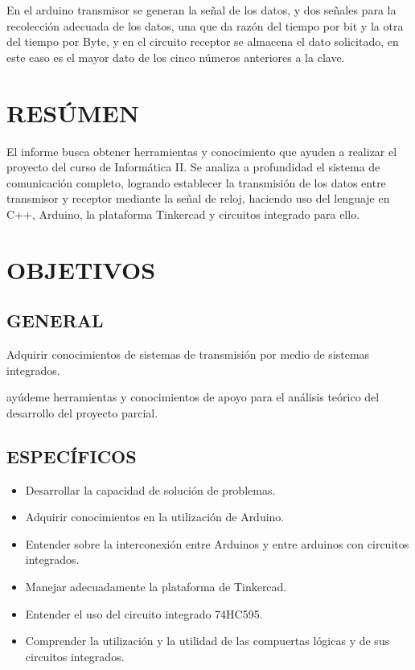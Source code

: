 \documentclass{article}
\begin{document}
En el arduino transmisor se generan la señal de los datos, y dos señales para la recolección adecuada de los datos, una que da razón del tiempo por bit y la otra del tiempo por Byte, y en el circuito receptor se almacena el dato solicitado, en este caso es el mayor dato de los cinco números anteriores a la clave.


\section{RESÚMEN}
El informe busca obtener herramientas y conocimiento que ayuden a realizar el proyecto del curso de Informática II. Se analiza a profundidad el sistema de comunicación completo, logrando  establecer la transmisión de los datos entre transmisor y receptor mediante la señal de reloj,  haciendo uso del lenguaje en C++, Arduino, la plataforma Tinkercad y circuitos integrado para ello.


\section{OBJETIVOS}

\subsection{GENERAL}

Adquirir conocimientos de sistemas de transmisión por medio de sistemas integrados.

ayúdeme herramientas y conocimientos de apoyo para el análisis teórico del desarrollo del proyecto parcial.

\subsection{ESPECÍFICOS}

\begin{itemize}

        \item Desarrollar la capacidad de solución de problemas.
        
        \item Adquirir conocimientos en la utilización de Arduino.
        
        \item Entender sobre la interconexión entre Arduinos y entre arduinos con circuitos integrados.
        
        \item Manejar adecuadamente la plataforma de Tinkercad.
        
        \item Entender el uso del circuito integrado 74HC595.
        
        \item Comprender la utilización y la utilidad de las compuertas lógicas y de sus circuitos integrados.
        
\end{itemize}
\end{document}
